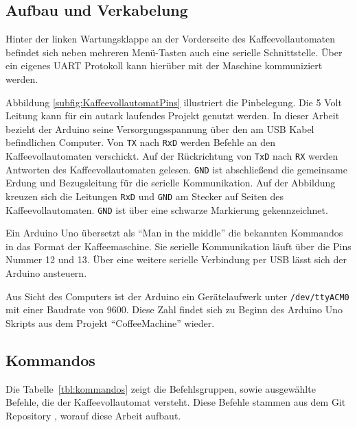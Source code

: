 \subsection{Aufbau und Verkabelung}
Hinter der linken Wartungsklappe an der Vorderseite des Kaffeevollautomaten befindet sich neben mehreren Menü-Tasten auch eine serielle Schnittstelle.
Über ein eigenes \ac{UART} Protokoll kann hierüber mit der Maschine kommuniziert werden.

Abbildung \ref{subfig:KaffeevollautomatPins} illustriert die Pinbelegung.
Die 5 Volt Leitung kann für ein autark laufendes Projekt genutzt werden.
In dieser Arbeit bezieht der Arduino seine Versorgungsspannung über den am USB Kabel befindlichen Computer.
Von \texttt{TX} nach \texttt{RxD} werden Befehle an den Kaffeevollautomaten verschickt.
Auf der Rückrichtung von \texttt{TxD} nach \texttt{RX} werden Antworten des Kaffeevollautomaten gelesen.
\texttt{GND} ist abschließend die gemeinsame Erdung und Bezugsleitung für die serielle Kommunikation.
Auf der Abbildung kreuzen sich die Leitungen \texttt{RxD} und \texttt{GND} am Stecker auf Seiten des Kaffeevollautomaten.
\texttt{GND} ist über eine schwarze Markierung gekennzeichnet.

Ein Arduino Uno übersetzt als "`Man in the middle"' die bekannten Kommandos in das Format der Kaffeemaschine.
Sie serielle Kommunikation läuft über die Pins Nummer 12 und 13.
Über eine weitere serielle Verbindung per USB lässt sich der Arduino ansteuern.

Aus Sicht des Computers ist der Arduino ein Gerätelaufwerk unter \texttt{/dev/ttyACM0} mit einer Baudrate von 9600.
Diese Zahl findet sich zu Beginn des Arduino Uno Skripts aus dem Projekt "`CoffeeMachine"'\cite{GitCoffeeMachine} wieder.


\subsection{Kommandos}\label{subsec:Kommandos}
Die Tabelle~\ref{tbl:kommandos} zeigt die Befehlsgruppen, sowie ausgewählte Befehle, die der Kaffeevollautomat versteht.
Diese Befehle stammen aus dem Git Repository \cite{GitCoffeeMachine}, worauf diese Arbeit aufbaut.

